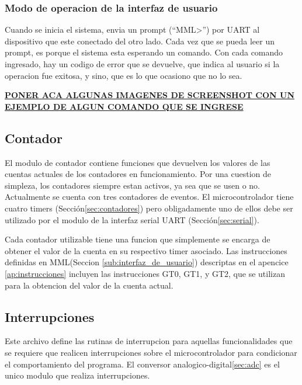\subsubsection{Modo de operacion de la interfaz de usuario} %
\label{ssub:modo_de_operacion_de_la_interfaz_de_usuario}


Cuando se inicia el sistema, envia un prompt (``MML>'') por UART al dispositivo que este conectado del otro lado. Cada vez que se pueda leer un prompt, es porque el sistema esta esperando un comando. Con cada comando ingresado, hay un codigo de error que se devuelve, que indica al usuario si la operacion fue exitosa, y sino, que es lo que ocasiono que no lo sea.

\textbf{\underline{PONER ACA ALGUNAS IMAGENES DE SCREENSHOT CON UN EJEMPLO DE ALGUN COMANDO QUE SE INGRESE}}


\subsection{Contador} %
\label{sub:contador}

El modulo de contador contiene funciones que devuelven los valores de las cuentas actuales de los contadores en funcionamiento. Por una cuestion de simpleza, los contadores siempre estan activos, ya sea que se usen o no. Actualmente se cuenta con tres contadores de eventos. El microcontrolador tiene cuatro timers (Sección\ref{sec:contadores}) pero obligadamente uno de ellos debe ser utilizado por el modulo de la interfaz serial UART (Secci\'on\ref{sec:serial}).

Cada contador utilizable tiene una funcion que simplemente se encarga de obtener el valor de la cuenta en su respectivo timer asociado. Las instrucciones definidas en MML(Seccion \ref{sub:interfaz_de_usuario}) descriptas en el apencice \ref{ap:instrucciones} incluyen las instrucciones GT0, GT1, y GT2, que se utilizan para la obtencion del valor de la cuenta actual.

\subsection{Interrupciones} %
\label{sub:interrupciones}

Este archivo define las rutinas de interrupcion para aquellas funcionalidades que se requiere que realicen interrupciones sobre el microcontrolador para condicionar el comportamiento del programa. El conversor analogico-digital\ref{sec:adc} es el unico modulo que realiza interrupciones.


\clearpage


